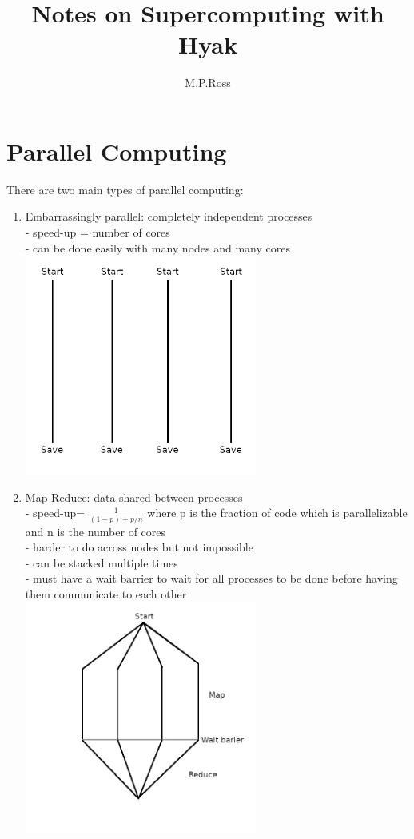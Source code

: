 \documentclass{article}
\title{Notes on Supercomputing with Hyak}
\author{M.P.Ross}
\begin{document}
\maketitle
\section{Parallel Computing}
There are two main types of parallel computing:
\begin{enumerate}
\item Embarrassingly parallel: completely independent processes\\
- speed-up = number of cores\\
- can be done easily with many nodes and many cores\\
\includegraphics[width=3in]{EmbarsParallel.png}
\item Map-Reduce: data shared between processes\\
- speed-up= $\frac{1}{(1-p)+p/n}$ where p is the fraction of code which is parallelizable and n is the number of cores\\
- harder to do across nodes but not impossible\\
- can be stacked multiple times\\
- must have a wait barrier to wait for all processes to be done before having them communicate to each other\\
\includegraphics[width=3in]{Map-Reduce.png}
\end{enumerate}
\end{document}
